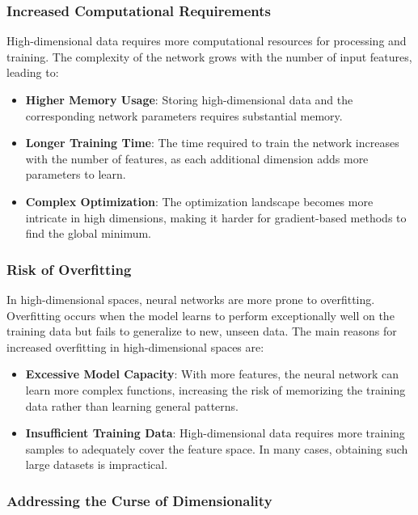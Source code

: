 \documentclass[11pt,a4paper]{article}
\begin{document}
\subsubsection{Increased Computational Requirements}

High-dimensional data requires more computational resources for processing and training. The complexity of the network grows with the number of input features, leading to:

\begin{itemize}
    \item \textbf{Higher Memory Usage}: Storing high-dimensional data and the corresponding network parameters requires substantial memory.
    \item \textbf{Longer Training Time}: The time required to train the network increases with the number of features, as each additional dimension adds more parameters to learn.
    \item \textbf{Complex Optimization}: The optimization landscape becomes more intricate in high dimensions, making it harder for gradient-based methods to find the global minimum.
\end{itemize}

\subsubsection{Risk of Overfitting}

In high-dimensional spaces, neural networks are more prone to overfitting. Overfitting occurs when the model learns to perform exceptionally well on the training data but fails to generalize to new, unseen data. The main reasons for increased overfitting in high-dimensional spaces are:

\begin{itemize}
    \item \textbf{Excessive Model Capacity}: With more features, the neural network can learn more complex functions, increasing the risk of memorizing the training data rather than learning general patterns.
    \item \textbf{Insufficient Training Data}: High-dimensional data requires more training samples to adequately cover the feature space. In many cases, obtaining such large datasets is impractical.
\end{itemize}

\subsubsection{Addressing the Curse of Dimensionality}
\end{document}
